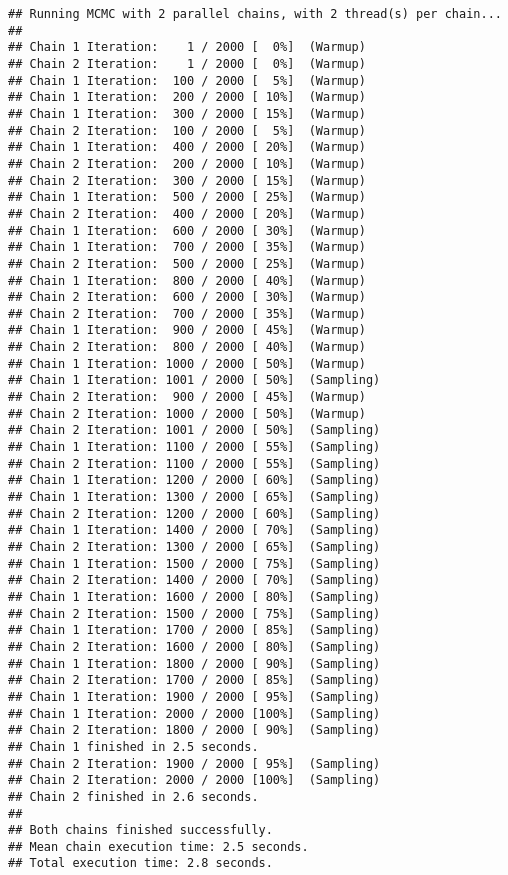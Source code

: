\documentclass[
]{article}
\begin{document}
\begin{verbatim}
## Running MCMC with 2 parallel chains, with 2 thread(s) per chain...
## 
## Chain 1 Iteration:    1 / 2000 [  0%]  (Warmup) 
## Chain 2 Iteration:    1 / 2000 [  0%]  (Warmup) 
## Chain 1 Iteration:  100 / 2000 [  5%]  (Warmup) 
## Chain 1 Iteration:  200 / 2000 [ 10%]  (Warmup) 
## Chain 1 Iteration:  300 / 2000 [ 15%]  (Warmup) 
## Chain 2 Iteration:  100 / 2000 [  5%]  (Warmup) 
## Chain 1 Iteration:  400 / 2000 [ 20%]  (Warmup) 
## Chain 2 Iteration:  200 / 2000 [ 10%]  (Warmup) 
## Chain 2 Iteration:  300 / 2000 [ 15%]  (Warmup) 
## Chain 1 Iteration:  500 / 2000 [ 25%]  (Warmup) 
## Chain 2 Iteration:  400 / 2000 [ 20%]  (Warmup) 
## Chain 1 Iteration:  600 / 2000 [ 30%]  (Warmup) 
## Chain 1 Iteration:  700 / 2000 [ 35%]  (Warmup) 
## Chain 2 Iteration:  500 / 2000 [ 25%]  (Warmup) 
## Chain 1 Iteration:  800 / 2000 [ 40%]  (Warmup) 
## Chain 2 Iteration:  600 / 2000 [ 30%]  (Warmup) 
## Chain 2 Iteration:  700 / 2000 [ 35%]  (Warmup) 
## Chain 1 Iteration:  900 / 2000 [ 45%]  (Warmup) 
## Chain 2 Iteration:  800 / 2000 [ 40%]  (Warmup) 
## Chain 1 Iteration: 1000 / 2000 [ 50%]  (Warmup) 
## Chain 1 Iteration: 1001 / 2000 [ 50%]  (Sampling) 
## Chain 2 Iteration:  900 / 2000 [ 45%]  (Warmup) 
## Chain 2 Iteration: 1000 / 2000 [ 50%]  (Warmup) 
## Chain 2 Iteration: 1001 / 2000 [ 50%]  (Sampling) 
## Chain 1 Iteration: 1100 / 2000 [ 55%]  (Sampling) 
## Chain 2 Iteration: 1100 / 2000 [ 55%]  (Sampling) 
## Chain 1 Iteration: 1200 / 2000 [ 60%]  (Sampling) 
## Chain 1 Iteration: 1300 / 2000 [ 65%]  (Sampling) 
## Chain 2 Iteration: 1200 / 2000 [ 60%]  (Sampling) 
## Chain 1 Iteration: 1400 / 2000 [ 70%]  (Sampling) 
## Chain 2 Iteration: 1300 / 2000 [ 65%]  (Sampling) 
## Chain 1 Iteration: 1500 / 2000 [ 75%]  (Sampling) 
## Chain 2 Iteration: 1400 / 2000 [ 70%]  (Sampling) 
## Chain 1 Iteration: 1600 / 2000 [ 80%]  (Sampling) 
## Chain 2 Iteration: 1500 / 2000 [ 75%]  (Sampling) 
## Chain 1 Iteration: 1700 / 2000 [ 85%]  (Sampling) 
## Chain 2 Iteration: 1600 / 2000 [ 80%]  (Sampling) 
## Chain 1 Iteration: 1800 / 2000 [ 90%]  (Sampling) 
## Chain 2 Iteration: 1700 / 2000 [ 85%]  (Sampling) 
## Chain 1 Iteration: 1900 / 2000 [ 95%]  (Sampling) 
## Chain 1 Iteration: 2000 / 2000 [100%]  (Sampling) 
## Chain 2 Iteration: 1800 / 2000 [ 90%]  (Sampling) 
## Chain 1 finished in 2.5 seconds.
## Chain 2 Iteration: 1900 / 2000 [ 95%]  (Sampling) 
## Chain 2 Iteration: 2000 / 2000 [100%]  (Sampling) 
## Chain 2 finished in 2.6 seconds.
## 
## Both chains finished successfully.
## Mean chain execution time: 2.5 seconds.
## Total execution time: 2.8 seconds.
\end{verbatim}
\end{document}
